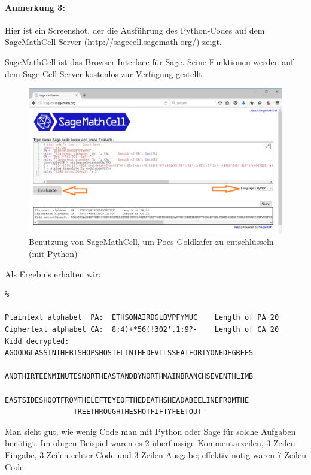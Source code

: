 \paragraph*{Anmerkung 3:}
Hier ist ein Screenshot, der die Ausführung des Python-Codes auf dem SageMathCell-Server
(\url{http://sagecell.sagemath.org/}) zeigt.

SageMathCell ist das Browser-Interface für Sage. Seine Funktionen werden auf dem Sage-Cell-Server
kostenlos zur Verfügung gestellt.

\begin{figure}[ht]
\begin{center}
\includegraphics[scale=0.53]{../en/figures/Using-SageMathCell-with-Python-for-Poes-GoldBug}
\caption{Benutzung von SageMathCell, um Poes Goldkäfer zu entschlüsseln (mit Python)}
\label{MOV_Using-SageMathCell-with-Python-for-Poes-GoldBug}
\end{center}
\end{figure}


Als Ergebnis erhalten wir:

\begin{Verbatim}%

Plaintext alphabet  PA:  ETHSONAIRDGLBVPFYMUC    Length of PA 20
Ciphertext alphabet CA:  8;4)+*56(!302'.1:9?-    Length of CA 20
Kidd decrypted: AGOODGLASSINTHEBISHOPSHOSTELINTHEDEVILSSEATFORTYONEDEGREES
                ANDTHIRTEENMINUTESNORTHEASTANDBYNORTHMAINBRANCHSEVENTHLIMB
                EASTSIDESHOOTFROMTHELEFTEYEOFTHEDEATHSHEADABEELINEFROMTHE
                TREETHROUGHTHESHOTFIFTYFEETOUT

\end{Verbatim}

Man sieht gut, wie wenig Code man mit Python oder Sage für solche Aufgaben benötigt.
Im obigen Beispiel waren es 2 überflüssige Kommentarzeilen, 3 Zeilen Eingabe, 3 Zeilen echter Code und 3 Zeilen Ausgabe;
effektiv nötig waren 7 Zeilen Code.





